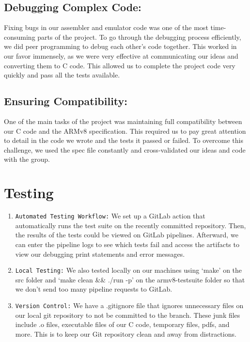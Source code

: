 \documentclass[11pt]{article}
\begin{document}
\subsection{Debugging Complex Code:}
Fixing bugs in our assembler and emulator code was one of the most time-consuming parts of the project. To go through the debugging process efficiently, we did peer programming to debug each other's code together. This worked in our favor immensely, as we were very effective at communicating our ideas and converting them to C code. This allowed us to complete the project code very quickly and pass all the tests available. 

\subsection{Ensuring Compatibility:}
One of the main tasks of the project was maintaining full compatibility between our C code and the ARMv8 specification. This required us to pay great attention to detail in the code we wrote and the tests it passed or failed. To overcome this challenge, we used the spec file constantly and cross-validated our ideas and code with the group.

\section{Testing}
\begin{enumerate}
    \item \verb|Automated Testing Workflow:| We  set up a GitLab action that automatically runs the test suite on the recently committed repository. Then, the results of the tests could be viewed on GitLab pipelines. Afterward, we can enter the pipeline logs to see which tests fail and access the artifacts to view our debugging print statements and error messages.
    
    \item \verb|Local Testing:|  We also tested locally on our machines using ‘make’ on the src folder and ‘make clean \&\& ./run -p’ on the armv8-testsuite folder so that we don’t send too many pipeline requests to GitLab.
    
    \item \verb|Version Control:|  We have a .gitignore file that ignores unnecessary files on our local git repository to not be committed to the branch. These junk files include .o files, executable files of our C code, temporary files, pdfs, and more. This is to keep our Git repository clean and away from distractions. 
\end{enumerate}
\end{document}

